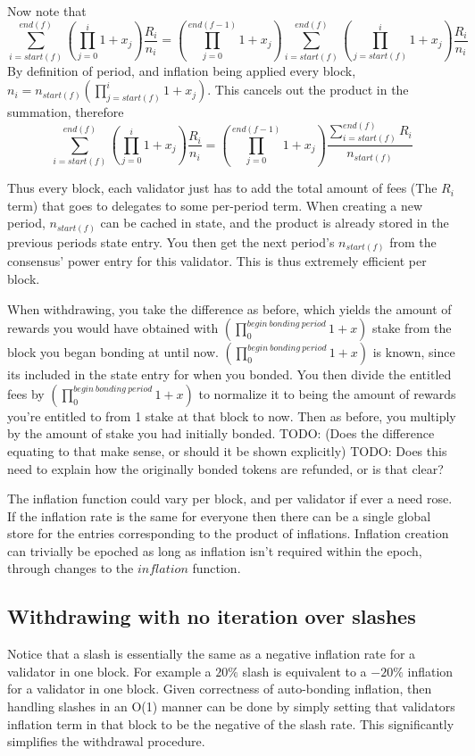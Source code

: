 \documentclass[]{article}
\begin{document}
Now note that 
$$\sum_{i = start(f)}^{end(f)}\left(\prod_{j = 0}^{i} 1 + x_j \right) \frac{R_i}{n_i} = \left(\prod_{j = 0}^{end(f - 1)} 1 + x_j \right)\sum_{i = start(f)}^{end(f)}\left(\prod_{j = start(f)}^{i} 1 + x_j \right) \frac{R_i}{n_i}$$
By definition of period, and inflation being applied every block, \\
$n_i = n_{start(f)}\left(\prod_{j = start(f)}^{i} 1 + x_j \right)$. This cancels out the product in the summation, therefore
$$\sum_{i = start(f)}^{end(f)}\left(\prod_{j = 0}^{i} 1 + x_j \right) \frac{R_i}{n_i} = \left(\prod_{j = 0}^{end(f - 1)} 1 + x_j \right)\frac{\sum_{i = start(f)}^{end(f)}R_i}{n_{start(f)}}$$

Thus every block, each validator just has to add the total amount of fees (The $R_i$ term) that goes to delegates to some per-period term.
When creating a new period, $n_{start(f)}$ can be cached in state, and the product is already stored in the previous periods state entry.
You then get the next period's $n_{start(f)}$ from the consensus' power entry for this validator. 
This is thus extremely efficient per block.

When withdrawing, you take the difference as before,
which yields the amount of rewards you would have obtained with $(\prod_0^{begin\ bonding\ period}1 + x)$ stake from the block you began bonding at until now.
$(\prod_0^{begin\ bonding\ period}1 + x)$ is known, since its included in the state entry for when you bonded.
You then divide the entitled fees by $(\prod_0^{begin\ bonding\ period}1 + x)$ to normalize it to being the amount of rewards you're entitled to from 1 stake at that block to now.
Then as before, you multiply by the amount of stake you had initially bonded.
TODO: (Does the difference equating to that make sense, or should it be shown explicitly)
TODO: Does this need to explain how the originally bonded tokens are refunded, or is that clear?

The inflation function could vary per block,
and per validator if ever a need rose. 
If the inflation rate is the same for everyone then there can be a single global store for the entries corresponding to the product of inflations.
Inflation creation can trivially be epoched as long as inflation isn't required within the epoch, through changes to the $inflation$ function.

\subsection{Withdrawing with no iteration over slashes}
Notice that a slash is essentially the same as a negative inflation rate for a validator in one block.
For example a $20\%$ slash is equivalent to a $-20\%$ inflation for a validator in one block.
Given correctness of auto-bonding inflation, then handling slashes in an O(1) manner can be done by simply setting that validators inflation term in that block to be the negative of the slash rate.
This significantly simplifies the withdrawal procedure.
\end{document}
